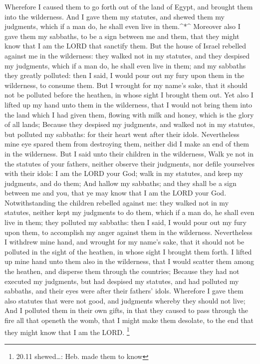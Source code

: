  Wherefore I caused them to go forth out of the land of
Egypt, and brought them into the wilderness.  And I gave
them my statutes, and shewed them my judgments, which if a man do, he
shall even live in them.\^{}*\^{}  Moreover also I gave
them my sabbaths, to be a sign between me and them, that they might know
that I am the LORD that sanctify them.  But the house of
Israel rebelled against me in the wilderness: they walked not in my
statutes, and they despised my judgments, which if a man do, he shall
even live in them; and my sabbaths they greatly polluted: then I said, I
would pour out my fury upon them in the wilderness, to consume them.
 But I wrought for my name's sake, that it should not be
polluted before the heathen, in whose sight I brought them out.
 Yet also I lifted up my hand unto them in the wilderness,
that I would not bring them into the land which I had given them,
flowing with milk and honey, which is the glory of all lands;
 Because they despised my judgments, and walked not in my
statutes, but polluted my sabbaths: for their heart went after their
idols.  Nevertheless mine eye spared them from destroying
them, neither did I make an end of them in the wilderness. 
But I said unto their children in the wilderness, Walk ye not in the
statutes of your fathers, neither observe their judgments, nor defile
yourselves with their idols:  I am the LORD your God; walk
in my statutes, and keep my judgments, and do them;  And
hallow my sabbaths; and they shall be a sign between me and you, that ye
may know that I am the LORD your God.  Notwithstanding the
children rebelled against me: they walked not in my statutes, neither
kept my judgments to do them, which if a man do, he shall even live in
them; they polluted my sabbaths: then I said, I would pour out my fury
upon them, to accomplish my anger against them in the wilderness.
 Nevertheless I withdrew mine hand, and wrought for my
name's sake, that it should not be polluted in the sight of the heathen,
in whose sight I brought them forth.  I lifted up mine hand
unto them also in the wilderness, that I would scatter them among the
heathen, and disperse them through the countries;  Because
they had not executed my judgments, but had despised my statutes, and
had polluted my sabbaths, and their eyes were after their fathers'
idols.  Wherefore I gave them also statutes that were not
good, and judgments whereby they should not live;  And I
polluted them in their own gifts, in that they caused to pass through
the fire all that openeth the womb, that I might make them desolate, to
the end that they might know that I am the LORD. \footnote{20.11
  shewed\ldots: Heb. made them to know}


